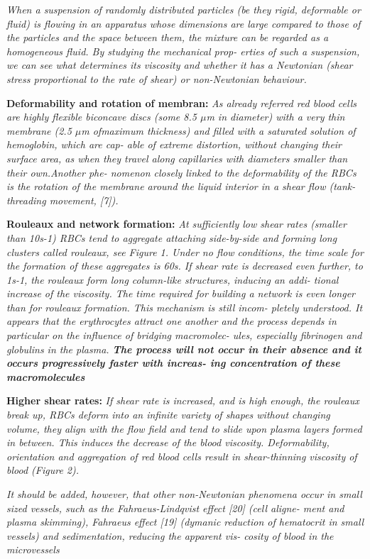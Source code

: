 \documentclass[11pt,letterpaper]{article}
\begin{document}
\textit{When a suspension of randomly distributed particles (be they rigid, deformable or fluid) is flowing in an apparatus whose dimensions are large compared to those of the particles and the space between them, the mixture can be regarded as a homogeneous fluid. By studying the mechanical prop- erties of such a suspension, we can see what determines its viscosity and whether it has a Newtonian (shear stress proportional to the rate of shear) or non-Newtonian behaviour.}

 \textbf{Deformability and rotation of membran:} \textit{As already referred red blood cells are highly flexible biconcave discs
(some 8.5 $\mu$m in diameter) with a very thin membrane (2.5 $\mu$m ofmaximum thickness) and filled with a saturated solution of hemoglobin, which are cap- able of extreme distortion, without changing their surface area, as when they travel along capillaries with diameters smaller than their own.Another phe- nomenon closely linked to the deformability of the RBCs is the rotation of the membrane around the liquid interior in a shear flow (tank-threading movement, [7]).}

\textbf{Rouleaux and network formation:} \textit{At sufficiently low shear rates (smaller than 10s-1) RBCs tend to aggregate attaching side-by-side and forming long clusters called rouleaux, see Figure 1. Under no flow conditions, the time scale for the formation of these aggregates is 60s. If shear rate is decreased even further, to 1s-1, the rouleaux form long column-like structures, inducing an addi- tional increase of the viscosity. The time required for building a network is even longer than for rouleaux formation. This mechanism is still incom- pletely understood. It appears that the erythrocytes attract one another and the process depends in particular on the influence of bridging macromolec- ules, especially fibrinogen and globulins in the plasma. \textbf{The process will not occur in their absence and it occurs progressively faster with increas- ing concentration of these macromolecules}}


\textbf{Higher shear rates:} \textit{If shear rate is increased, and is high enough, the rouleaux break up, RBCs deform into an infinite variety of shapes without changing volume, they align with the flow field and tend to slide upon plasma layers formed in between. This induces the decrease of the blood viscosity. Deformability, orientation and aggregation of red blood cells result in shear-thinning viscosity of blood (Figure 2).}

\textit{It should be added, however, that other non-Newtonian phenomena occur in small sized vessels, such as the Fahraeus-Lindqvist effect [20] (cell aligne- ment and plasma skimming), Fahraeus effect [19] (dymanic reduction of hematocrit in small vessels) and sedimentation, reducing the apparent vis- cosity of blood in the microvessels}
\end{document}
